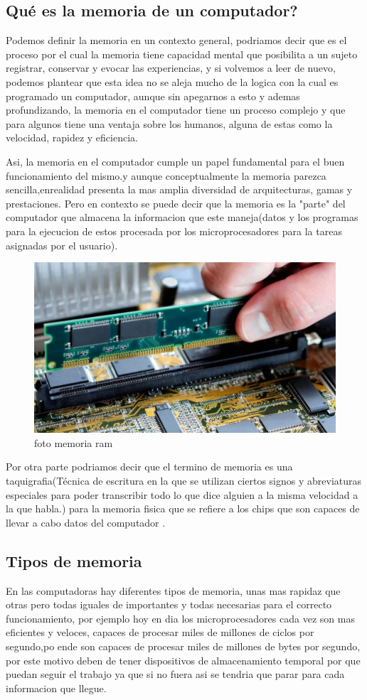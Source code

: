 \documentclass{article}
\begin{document}
    \subsection{Qué es la memoria de un computador?}
    Podemos definir la memoria en un contexto general, podriamos decir que es el proceso por el cual la memoria tiene capacidad mental que posibilita a un sujeto registrar, conservar y evocar las experiencias\cite{hipocampo}, y si volvemos a leer de nuevo, podemos plantear que esta idea no se aleja mucho de la logica con la cual es programado un computador, aunque sin apegarnos a esto y ademas profundizando, la memoria en el computador tiene un proceso complejo y que para algunos tiene una ventaja sobre los humanos, alguna de estas como la velocidad, rapidez y eficiencia.
    
    Asi, la memoria en el computador cumple un papel fundamental para el buen funcionamiento del mismo.y aunque conceptualmente la memoria parezca sencilla,enrealidad presenta la mas amplia diversidad de arquitecturas, gamas y prestaciones\cite{academia}.
    Pero en contexto se puede decir que la memoria es la "parte" del computador que almacena la informacion que este maneja(datos y los programas para la ejecucion de estos procesada por los microprocesadores para la tareas asignadas por el usuario).\cite{academia}

    \begin{figure}[h]
    \includegraphics[width=6 cm]{imagenes/tipo_memoria.jpg}
    \centering
    \caption{foto memoria ram}
    \label{fig:tipo_memoria}
    \end{figure}

    Por otra parte podriamos decir que el termino de memoria es una taquigrafia(Técnica de escritura en la que se utilizan ciertos signos y abreviaturas especiales para poder transcribir todo lo que dice alguien a la misma velocidad a la que habla.) para la memoria fisica que se refiere a los chips que son capaces de llevar a cabo datos del computador \cite{monografias}.
    
    \subsection{Tipos de memoria}
    En las computadoras hay diferentes tipos de memoria, unas mas rapidaz que otras pero todas iguales de importantes y todas necesarias para el correcto funcionamiento, por ejemplo hoy en dia los microprocesadores cada vez son mas eficientes y veloces, capaces de procesar miles de millones de ciclos por segundo,po ende son capaces de procesar 
    miles de millones de bytes por segundo, por este motivo deben de tener dispositivos de almacenamiento temporal por que puedan seguir el trabajo ya que si no fuera asi se tendria que parar para cada informacion que llegue.
    
\end{document}
